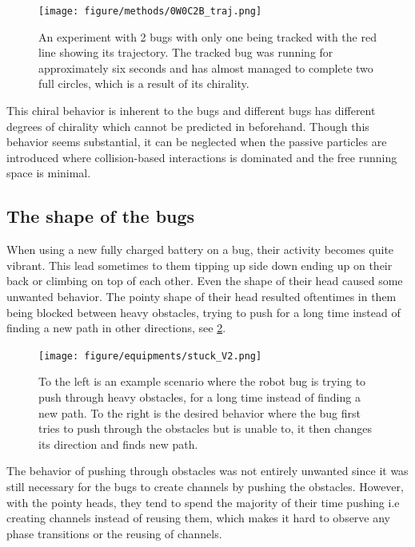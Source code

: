 \begin{figure}[htpb!]
    \centering
    \texttt{[image: figure/methods/0W0C2B\_traj.png]}
    \caption{An experiment with 2 bugs with only one being tracked 
    with the red line showing its trajectory. The tracked bug was 
    running for approximately six seconds and has almost managed to 
    complete two full circles, which is a result of its chirality.}
    \label{fig:chirality}
\end{figure}

This chiral behavior is inherent to the bugs and different bugs has different degrees of chirality which 
cannot be predicted in beforehand. Though this behavior seems substantial, it can be neglected when 
the passive particles are introduced where collision-based interactions is dominated and the free running 
space is minimal.

\subsection{The shape of the bugs}

When using a new fully charged battery on a bug, their activity becomes quite vibrant. This lead
sometimes to them tipping up side down ending up on their back or climbing on top of each other. 
Even the shape of their head caused some unwanted behavior. The pointy shape of their head resulted oftentimes
in them being blocked between heavy obstacles, trying to push for a long time instead of finding a new path in 
other directions, see \cref{fig:stuck}.

\begin{figure}[htpb!]
    \centering
    \texttt{[image: figure/equipments/stuck\_V2.png]}
    \caption{To the left is an example scenario where the robot bug is trying to push through heavy obstacles, for a long time 
    instead of finding a new path. To the right is the desired behavior where the bug first tries to push through the obstacles 
    but is unable to, it then changes its direction and finds new path.}
    \label{fig:stuck}
\end{figure}

The behavior of pushing through obstacles was not entirely unwanted since it was still necessary for
the bugs to create channels by pushing the obstacles. However, with the pointy heads, they tend to 
spend the majority of their time pushing i.e creating channels instead of reusing them, which makes 
it hard to observe any phase transitions or the reusing of channels.

